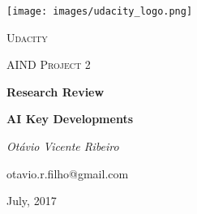 \documentclass[12pt, a4paper]{article}
\begin{document}
	
\begin{titlepage}
\centering
\texttt{[image: images/udacity\_logo.png]}\par\vspace{1cm}
{\scshape\LARGE Udacity \par}
\vspace{1cm}
{\scshape\Large AIND Project 2\par}
\vspace{1.5cm}
{\huge\bfseries Research Review \par}
{\huge\bfseries AI Key Developments\par}
\vspace{2cm}
{\Large\itshape Otávio Vicente Ribeiro\par}
{\large\ttfamily otavio.r.filho@gmail.com\par}

\vfill

{July, 2017\par}
\end{titlepage}
	


\nocite{aima}

%

\end{document}
